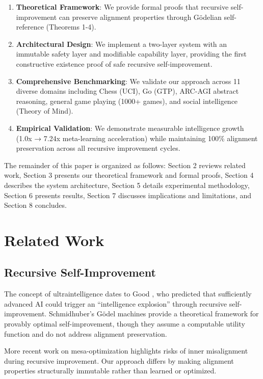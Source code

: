 \documentclass[11pt,letterpaper]{article}
\begin{document}
\begin{enumerate}
\item \textbf{Theoretical Framework}: We provide formal proofs that recursive self-improvement can preserve alignment properties through Gödelian self-reference (Theorems 1-4).

\item \textbf{Architectural Design}: We implement a two-layer system with an immutable safety layer and modifiable capability layer, providing the first constructive existence proof of safe recursive self-improvement.

\item \textbf{Comprehensive Benchmarking}: We validate our approach across 11 diverse domains including Chess (UCI), Go (GTP), ARC-AGI abstract reasoning, general game playing (1000+ games), and social intelligence (Theory of Mind).

\item \textbf{Empirical Validation}: We demonstrate measurable intelligence growth (1.0x → 7.24x meta-learning acceleration) while maintaining 100\% alignment preservation across all recursive improvement cycles.
\end{enumerate}

The remainder of this paper is organized as follows: Section 2 reviews related work, Section 3 presents our theoretical framework and formal proofs, Section 4 describes the system architecture, Section 5 details experimental methodology, Section 6 presents results, Section 7 discusses implications and limitations, and Section 8 concludes.

\section{Related Work}

\subsection{Recursive Self-Improvement}

The concept of ultraintelligence dates to Good \cite{good1965}, who predicted that sufficiently advanced AI could trigger an ``intelligence explosion'' through recursive self-improvement. Schmidhuber's Gödel machines \cite{schmidhuber2007} provide a theoretical framework for provably optimal self-improvement, though they assume a computable utility function and do not address alignment preservation.

More recent work on mesa-optimization \cite{hubinger2019} highlights risks of inner misalignment during recursive improvement. Our approach differs by making alignment properties structurally immutable rather than learned or optimized.
\end{document}

